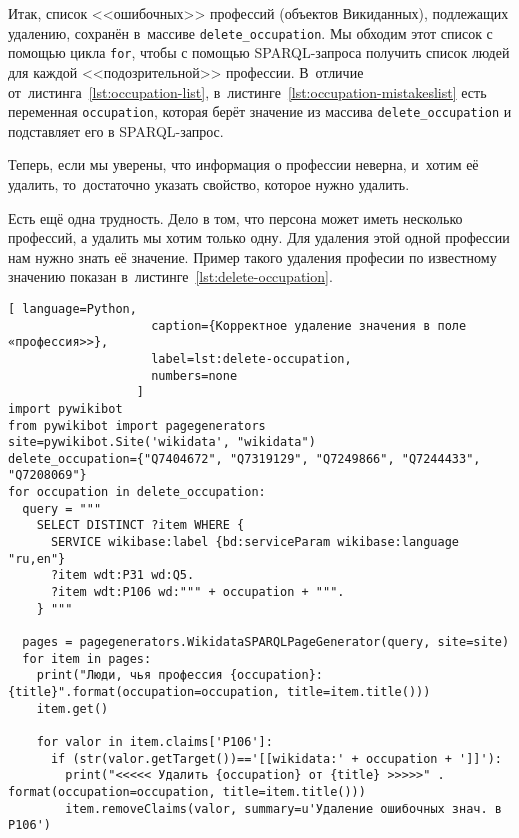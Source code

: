 Итак, список <<ошибочных>> профессий (объектов Викиданных), подлежащих удалению, 
сохранён в~массиве \lstinline|delete_occupation|. 
Мы обходим этот список с помощью цикла \lstinline|for|, 
чтобы с помощью SPARQL-запроса получить список людей для каждой <<подозрительной>> профессии. 
В~отличие от~листинга~\ref{lst:occupation-list}, 
в~листинге~\ref{lst:occupation-mistakeslist} есть переменная \lstinline|occupation|, 
которая берёт значение из массива \lstinline|delete_occupation| и подставляет его в SPARQL-запрос.

Теперь, если мы уверены, что информация о профессии неверна, 
и~хотим её удалить, то~достаточно указать свойство, которое нужно удалить.

Есть ещё одна трудность. 
Дело в том, что персона может иметь несколько профессий, а удалить мы хотим только одну. 
Для удаления этой одной профессии нам нужно знать её значение. 
Пример такого удаления професии по известному значению 
показан в~листинге~\ref{lst:delete-occupation}. 



\newpage
{}
\begin{lstlisting}[ language=Python,
                    caption={Корректное удаление значения в поле «профессия>>},
                    label=lst:delete-occupation, 
                    numbers=none
                  ]
import pywikibot
from pywikibot import pagegenerators
site=pywikibot.Site('wikidata', "wikidata")
delete_occupation={"Q7404672", "Q7319129", "Q7249866", "Q7244433", 
"Q7208069"}
for occupation in delete_occupation:
  query = """
    SELECT DISTINCT ?item WHERE {
      SERVICE wikibase:label {bd:serviceParam wikibase:language "ru,en"}
      ?item wdt:P31 wd:Q5.
      ?item wdt:P106 wd:""" + occupation + """.
    } """

  pages = pagegenerators.WikidataSPARQLPageGenerator(query, site=site)
  for item in pages:
    print("Люди, чья профессия {occupation}: {title}".format(occupation=occupation, title=item.title()))
    item.get()

    for valor in item.claims['P106']:
      if (str(valor.getTarget())=='[[wikidata:' + occupation + ']]'):
        print("<<<<< Удалить {occupation} от {title} >>>>>" . format(occupation=occupation, title=item.title()))
        item.removeClaims(valor, summary=u'Удаление ошибочных знач. в P106')
\end{lstlisting} 

